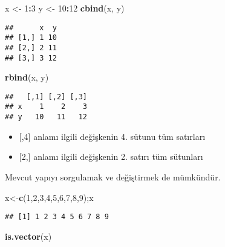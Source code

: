 \documentclass[
]{book}
\newenvironment{Shaded}{\begin{snugshade}}{\end{snugshade}}
\newcommand{\DecValTok}[1]{\textcolor[rgb]{0.00,0.00,0.81}{#1}}
\newcommand{\KeywordTok}[1]{\textcolor[rgb]{0.13,0.29,0.53}{\textbf{#1}}}
\newcommand{\NormalTok}[1]{#1}
\newcommand{\OperatorTok}[1]{\textcolor[rgb]{0.81,0.36,0.00}{\textbf{#1}}}
\newcommand{\StringTok}[1]{\textcolor[rgb]{0.31,0.60,0.02}{#1}}
\begin{document}
\begin{Shaded}
\begin{Highlighting}[]
\NormalTok{x <-}\StringTok{ }\DecValTok{1}\OperatorTok{:}\DecValTok{3}
\NormalTok{y <-}\StringTok{ }\DecValTok{10}\OperatorTok{:}\DecValTok{12}
\KeywordTok{cbind}\NormalTok{(x, y)}
\end{Highlighting}
\end{Shaded}

\begin{verbatim}
##      x  y
## [1,] 1 10
## [2,] 2 11
## [3,] 3 12
\end{verbatim}

\begin{Shaded}
\begin{Highlighting}[]
\KeywordTok{rbind}\NormalTok{(x, y)}
\end{Highlighting}
\end{Shaded}

\begin{verbatim}
##   [,1] [,2] [,3]
## x    1    2    3
## y   10   11   12
\end{verbatim}

\begin{itemize}
\item
  {[},4{]} anlamı ilgili değişkenin 4. sütunu tüm satırları
\item
  {[}2,{]} anlamı ilgili değişkenin 2. satırı tüm sütunları
\end{itemize}

Mevcut yapıyı sorgulamak ve değiştirmek de mümkündür.

\begin{Shaded}
\begin{Highlighting}[]
\NormalTok{x<-}\KeywordTok{c}\NormalTok{(}\DecValTok{1}\NormalTok{,}\DecValTok{2}\NormalTok{,}\DecValTok{3}\NormalTok{,}\DecValTok{4}\NormalTok{,}\DecValTok{5}\NormalTok{,}\DecValTok{6}\NormalTok{,}\DecValTok{7}\NormalTok{,}\DecValTok{8}\NormalTok{,}\DecValTok{9}\NormalTok{);x}
\end{Highlighting}
\end{Shaded}

\begin{verbatim}
## [1] 1 2 3 4 5 6 7 8 9
\end{verbatim}

\begin{Shaded}
\begin{Highlighting}[]
\KeywordTok{is.vector}\NormalTok{(x)}
\end{Highlighting}
\end{Shaded}
\end{document}
